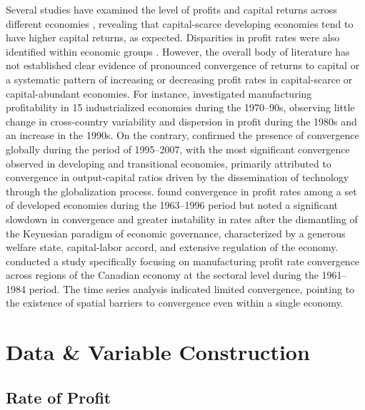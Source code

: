 \documentclass[10pt]{article}
\begin{document}
\par Several studies have examined the level of profits and capital returns across different economies \citep{bigsten2000rates, udry2006return}, revealing that capital-scarce developing economies tend to have higher capital returns, as expected. Disparities in profit rates were also identified within economic groups \citep{harberger1978distributional}. However, the overall body of literature has not established clear evidence of pronounced convergence of returns to capital or a systematic pattern of increasing or decreasing profit rates in capital-scarce or capital-abundant economies. For instance, \citet{Glyn2004} investigated manufacturing profitability in 15 industrialized economies during the 1970--90s, observing little change in cross-country variability and dispersion in profit during the 1980s and an increase in the 1990s. On the contrary, \citet{ChouIzyumovVahaly2015} confirmed the presence of convergence globally during the period of 1995--2007, with the most significant convergence observed in developing and transitional economies, primarily attributed to convergence in output-capital ratios driven by the dissemination of technology through the globalization process. \citet{Carter2004} found convergence in profit rates among a set of developed economies during the 1963--1996 period but noted a significant slowdown in convergence and greater instability in rates after the dismantling of the Keynesian paradigm of economic governance, characterized by a generous welfare state, capital-labor accord, and extensive regulation of the economy. \citet{rigby1991technical} conducted a study specifically focusing on manufacturing profit rate convergence across regions of the Canadian economy at the sectoral level during the 1961--1984 period. The time series analysis indicated limited convergence, pointing to the existence of spatial barriers to convergence even within a single economy.

\section{Data \& Variable Construction}
\label{sec:data}

\subsection{Rate of Profit}
\end{document}
